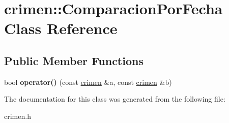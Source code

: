\hypertarget{classcrimen_1_1ComparacionPorFecha}{}\section{crimen\+:\+:Comparacion\+Por\+Fecha Class Reference}
\label{classcrimen_1_1ComparacionPorFecha}
\subsection*{Public Member Functions}
\begin{DoxyCompactItemize}
\item 
\hypertarget{classcrimen_1_1ComparacionPorFecha_a32b59f6736185c8506e5c52fa3f4f221}{}bool {\bfseries operator()} (const \hyperlink{classcrimen}{crimen} \&a, const \hyperlink{classcrimen}{crimen} \&b)\label{classcrimen_1_1ComparacionPorFecha_a32b59f6736185c8506e5c52fa3f4f221}

\end{DoxyCompactItemize}


The documentation for this class was generated from the following file\+:\begin{DoxyCompactItemize}
\item 
crimen.\+h\end{DoxyCompactItemize}
